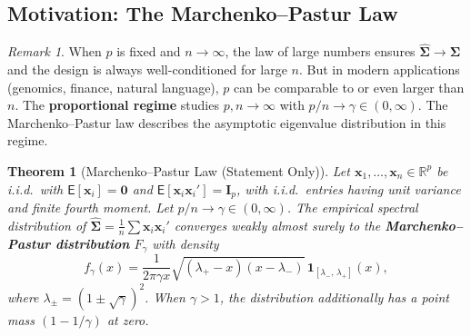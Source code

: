 \documentclass[14pt]{extarticle}
\theoremstyle{plain}
\newtheorem{theorem}{Theorem}[section]
\theoremstyle{definition}
\theoremstyle{remark}
\newtheorem*{remark}{Remark}
\newcommand\expc{\mathsf{E}}
\newcommand{\bx}{\mathbf{x}}
\newcommand{\bI}{\mathbf{I}}
\newcommand{\bzero}{\mathbf{0}}
\newcommand{\Real}{\mathbb{R}}
\newcommand{\bSigma}{\boldsymbol{\Sigma}}
\newcommand{\hbSigma}{\hat{\boldsymbol{\Sigma}}}
\begin{document}
\subsection{Motivation: The Marchenko--Pastur Law}

\begin{remark}
When $p$ is fixed and $n \to \infty$, the law of large numbers ensures $\hbSigma \to \bSigma$ and the design is always well-conditioned for large $n$. But in modern applications (genomics, finance, natural language), $p$ can be comparable to or even larger than $n$. The \textbf{proportional regime} studies $p, n \to \infty$ with $p/n \to \gamma \in (0, \infty)$. The Marchenko--Pastur law describes the asymptotic eigenvalue distribution in this regime.
\end{remark}

\begin{theorem}[Marchenko--Pastur Law (Statement Only)]\label{thm:marchenko-pastur}
Let $\bx_1, \ldots, \bx_n \in \Real^p$ be i.i.d.\ with $\expc[\bx_i] = \bzero$ and $\expc[\bx_i\bx_i'] = \bI_p$, with i.i.d.\ entries having unit variance and finite fourth moment. Let $p/n \to \gamma \in (0, \infty)$. The empirical spectral distribution of $\hbSigma = \frac{1}{n}\sum \bx_i\bx_i'$ converges weakly almost surely to the \textbf{Marchenko--Pastur distribution} $F_\gamma$ with density
\begin{equation}\label{eq:mp-density}
f_\gamma(x) = \frac{1}{2\pi\gamma x}\sqrt{(\lambda_+ - x)(x - \lambda_-)}\,\mathbf{1}_{[\lambda_-,\,\lambda_+]}(x),
\end{equation}
where $\lambda_\pm = (1 \pm \sqrt\gamma)^2$. When $\gamma > 1$, the distribution additionally has a point mass $(1 - 1/\gamma)$ at zero.
\end{theorem}
\end{document}
